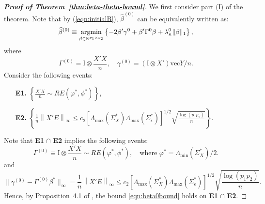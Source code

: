 \medskip
\begin{proof}[\textbf{Proof of Theorem~\ref{thm:beta-theta-bound}}] We first consider part (I) of the theorem. Note that by (\ref{eqn:initialB}), $\widehat{\beta}^{(0)}$ can be equivalently written as:
\begin{equation}\label{eqn:beta0}
\widehat{\beta}^{(0)} \equiv \mathop{\text{argmin}}\limits_{\beta\in\mathbb{R}^{p_1\times p_2}}\left\{-2\beta'\gamma^0 + \beta'\Gamma^0\beta + \lambda_n^0\|\beta\|_1 \right\},
\end{equation}
where 
\begin{equation*}
\Gamma^{(0)} = \mathrm{I} \otimes \frac{X'X}{n}, \quad \gamma^{(0)} = (\mathrm{I} \otimes X')\mathrm{vec}{Y}/n.
\end{equation*}
Consider the following events:
\begin{itemize}
\item[\bf E1.] $\left\{\frac{X'X}{n}\sim RE(\varphi^*,\phi^*)\right\}$, 
\item[\bf E2.] $\left\{\frac{1}{n}\left\| X'E \right\|_\infty \leq c_2\left[\Lambda_{\max}(\Sigma_X^*)\Lambda_{\max}(\Sigma_\epsilon^*)\right]^{1/2}\sqrt{\frac{\log(p_1p_2)}{n}}\right\}$.
\end{itemize}
Note that \textbf{E1} $\cap$ \textbf{E2} implies the following events:
\begin{equation*}
\Gamma^{(0)} \equiv \mathrm{I}\otimes \frac{X'X}{n} \sim RE(\varphi^*,\phi^*), \quad \text{where }\varphi^*=\Lambda_{\min}(\Sigma_X^*)/2. 
\end{equation*}
and
\begin{equation}\label{bound:gamma0}
\|\gamma^{(0)} - \Gamma^{(0)}\beta^*\|_\infty = \frac{1}{n}\left\| X'E \right\|_\infty \leq c_2\left[\Lambda_{\max}(\Sigma_X^*)\Lambda_{\max}(\Sigma_\epsilon^*)\right]^{1/2}\sqrt{\frac{\log(p_1p_2)}{n}}.
\end{equation}
Hence, by Proposition~4.1 of \citet{basu2015estimation}, the bound \eqref{eqn:beta0bound} holds on \textbf{E1} $\cap$ \textbf{E2}.


\end{proof}
